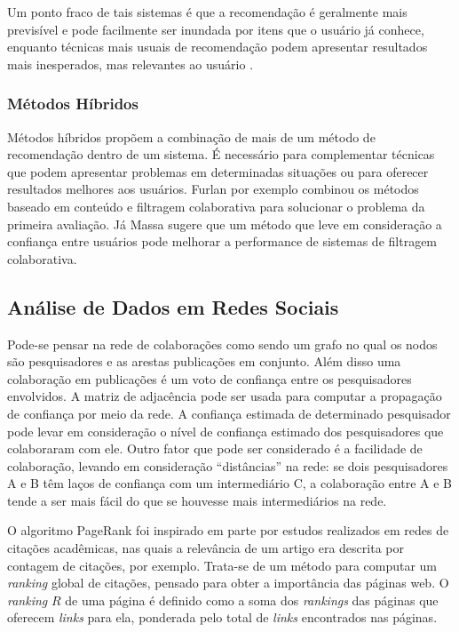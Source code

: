 \documentclass[12pt]{article}
\begin{document}
Um ponto fraco de tais sistemas é que a recomendação é geralmente mais previsível e pode facilmente ser inundada por itens que o 
usuário já conhece, enquanto técnicas mais usuais de recomendação podem apresentar resultados mais inesperados, mas relevantes ao 
usuário \cite{sinha2001comparing}.

\subsubsection{Métodos Híbridos}

Métodos híbridos propõem a combinação de mais de um método de recomendação dentro de um sistema. É necessário para complementar 
técnicas que podem apresentar problemas em determinadas situações ou para oferecer resultados melhores aos usuários. Furlan 
\cite{da2018desenvolvimento} por exemplo combinou os métodos baseado em conteúdo e filtragem colaborativa para solucionar o problema da primeira 
avaliação. Já Massa \cite{massa2004trust} sugere que um método que leve em consideração a confiança entre usuários pode melhorar a 
performance de sistemas de filtragem colaborativa.


\subsection{Análise de Dados em Redes Sociais}\label{sect:analysis}

Pode-se pensar na rede de colaborações como sendo um grafo no qual os nodos são pesquisadores e as arestas publicações em conjunto. 
Além disso uma colaboração em publicações é um voto de confiança entre os pesquisadores envolvidos. A matriz de adjacência pode ser usada 
para computar a propagação de confiança por meio da rede. A confiança estimada de determinado pesquisador pode levar em consideração 
o nível de confiança estimado dos pesquisadores que colaboraram com ele. Outro fator que pode ser considerado é a facilidade de 
colaboração, levando em  consideração “distâncias” na rede: se dois pesquisadores A e B têm laços de confiança com um intermediário 
C, a colaboração entre A e B tende a ser mais fácil do que se houvesse mais intermediários na rede.

O algoritmo PageRank \cite{page1999pagerank} foi inspirado em parte por estudos realizados em redes de citações acadêmicas, nas 
quais a relevância de um artigo era descrita por contagem de citações, por exemplo. Trata-se de um método para computar um \textit{ranking}  global de citações, pensado para obter a importância das páginas web. O \textit{ranking} $R$ de uma página é definido como a soma dos  \textit{rankings} das páginas que oferecem \textit{links} para ela, ponderada pelo total de \textit{links} encontrados nas páginas.
\end{document}
